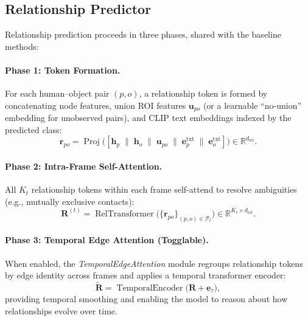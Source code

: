 \documentclass{article}
\newcommand{\mR}{\mathbb{R}}
\newcommand{\op}[1]{\operatorname{#1}}
\newcommand{\mat}[1]{\bm{#1}}
\begin{document}
\subsection{Relationship Predictor}

Relationship prediction proceeds in three phases, shared with the baseline methods:

\paragraph{Phase 1: Token Formation.}  For each human--object pair $(p, o)$, a relationship token is formed by concatenating node features, union ROI features $\mat{u}_{po}$ (or a learnable ``no-union'' embedding for unobserved pairs), and CLIP text embeddings indexed by the predicted class:
\begin{equation}
    \mat{r}_{po} = \op{Proj}\bigl([\mat{h}_p \;\|\; \mat{h}_o \;\|\; \mat{u}_{po} \;\|\; \mat{e}_p^{\text{txt}} \;\|\; \mat{e}_o^{\text{txt}}]\bigr) \in \mR^{d_{\text{rel}}}.
    \label{eq:rel_token}
\end{equation}

\paragraph{Phase 2: Intra-Frame Self-Attention.}  All $K_t$ relationship tokens within each frame self-attend to resolve ambiguities (e.g., mutually exclusive contacts):
\begin{equation}
    \mat{R}^{(t)} = \op{RelTransformer}\bigl(\{\mat{r}_{po}\}_{(p,o) \in \mathcal{P}_t}\bigr) \in \mR^{K_t \times d_{\text{rel}}}.
    \label{eq:rel_attn}
\end{equation}

\paragraph{Phase 3: Temporal Edge Attention (Togglable).}  When enabled, the \emph{TemporalEdgeAttention} module regroups relationship tokens by edge identity across frames and applies a temporal transformer encoder:
\begin{equation}
    \tilde{\mat{R}} = \op{TemporalEncoder}\bigl(\mat{R} + \mat{e}_{\tau}\bigr),
    \label{eq:tea}
\end{equation}
providing temporal smoothing and enabling the model to reason about how relationships evolve over time.
\end{document}
